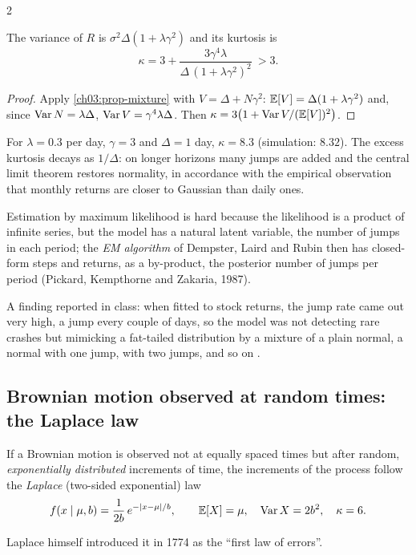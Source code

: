 \begin{paracol}{2}
\begin{proposition}\label{ch13:prop-pjd}
The variance of $R$ is $\sigma^2\Delta(1+\lambda\gamma^2)$ and its kurtosis is
\[
  \kappa=3+\frac{3\gamma^4\lambda}{\Delta\,(1+\lambda\gamma^2)^2}\ >3 .
\]
\end{proposition}
\begin{proof}
Apply \cref{ch03:prop-mixture} with $V=\Delta+N\gamma^2$: $\mathbb{E}[V]=\Delta(1+\lambda\gamma^2)$ and, since $\operatorname{Var} N=\lambda\Delta$, $\operatorname{Var} V=\gamma^4\lambda\Delta$. Then
$\kappa=3\bigl(1+\operatorname{Var} V/(\mathbb{E}[V])^2\bigr)$.
\end{proof}
For $\lambda=0.3$ per day, $\gamma=3$ and $\Delta=1$ day, $\kappa=8.3$ (simulation: $8.32$). The excess kurtosis decays as $1/\Delta$: on longer horizons many jumps are added
and the central limit theorem restores normality, in accordance with the empirical observation that monthly returns are closer to Gaussian than daily ones.
\begin{secondary}
Estimation by maximum likelihood is hard because the likelihood is a product of infinite series, but the model has a natural latent variable, the number of jumps in each period; the
\emph{EM algorithm} of Dempster, Laird and Rubin then has closed-form steps and returns, as a by-product, the posterior number of jumps per period
 (Pickard, Kempthorne and Zakaria, 1987).
\end{secondary}
A finding reported in class: when fitted to stock returns, the jump rate came out very high, a jump every
couple of days, so the model was not detecting rare crashes but mimicking a fat-tailed distribution by a mixture of a plain normal, a normal with one jump, with two jumps, and so on
.

\subsection{Brownian motion observed at random times: the Laplace law}\label{ch13:sec-laplace}
If a Brownian motion is observed not at equally spaced times but after random, \emph{exponentially distributed} increments of time, the increments of the process follow the
\emph{Laplace} (two-sided exponential) law 
\begin{equation}\label{ch13:eq-laplace}
  f(x\mid\mu,b)=\frac1{2b}\,e^{-|x-\mu|/b},\qquad \mathbb{E}[X]=\mu,\quad \operatorname{Var} X=2b^2,\quad \kappa=6 .
\end{equation}
\begin{history}
Laplace himself introduced it in 1774 as the ``first law of errors''.


\end{history}
\end{paracol}
